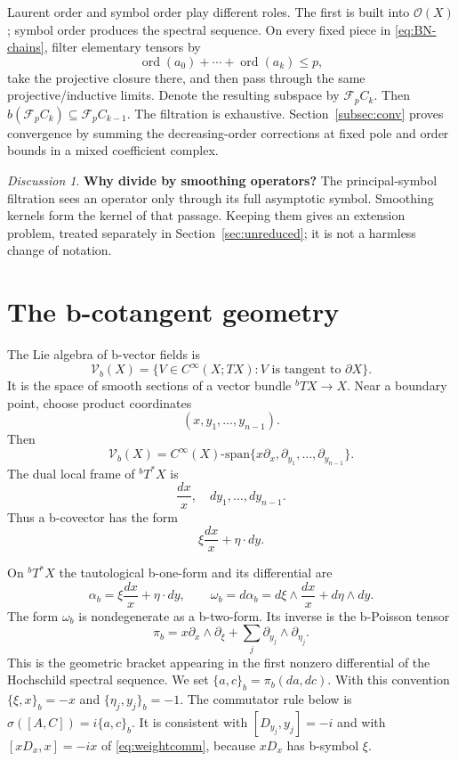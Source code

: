 \documentclass[11pt,oneside,reqno]{article}
\newcommand{\cO}{\mathcal O}
\newcommand{\Tbstar}{{}^{b}T^*X}
\theoremstyle{plain}
\theoremstyle{definition}
\theoremstyle{remark}
\newtheorem*{discussion}{Discussion}
\begin{document}
Laurent order and symbol order play different roles. The first is built
into \(\cO(X)\); symbol order produces the spectral sequence.  On every
fixed piece in \eqref{eq:BN-chains}, filter elementary tensors by
\[
 \operatorname{ord}(a_0)+\cdots+\operatorname{ord}(a_k)\leq p,
\]
take the projective closure there, and then pass through the same
projective/inductive limits.  Denote the resulting subspace by
\(\mathcal F_pC_k\).
Then \(b(\mathcal F_pC_k)\subseteq\mathcal F_pC_{k-1}\). The
filtration is exhaustive. Section~\ref{subsec:conv} proves convergence
by summing the decreasing-order corrections at fixed pole and order
bounds in a mixed coefficient complex.

\begin{discussion}
\textbf{Why divide by smoothing operators?}
The principal-symbol filtration sees an operator only through its full
asymptotic symbol. Smoothing kernels form the kernel of that passage. Keeping
them gives an extension problem, treated separately in
Section~\ref{sec:unreduced}; it is not a harmless change of notation.
\end{discussion}

\section{The b-cotangent geometry}

The Lie algebra of b-vector fields is
\[
 \mathcal V_b(X)
 =\{V\in C^\infty(X;TX):V\text{ is tangent to }\partial X\}.
\]
It is the space of smooth sections of a vector bundle \({}^bTX\to X\).
Near a boundary point, choose product coordinates
\[
 (x,y_1,\ldots,y_{n-1}).
\]
Then
\[
 \mathcal V_b(X)
 =C^\infty(X)\text{-span}
 \{x\partial_x,\partial_{y_1},\ldots,\partial_{y_{n-1}}\}.
\]
The dual local frame of \(\Tbstar\) is
\[
 \frac{dx}{x},\quad dy_1,\ldots,dy_{n-1}.
\]
Thus a b-covector has the form
\[
 \xi\frac{dx}{x}+\eta\cdot dy.
\]

On \(\Tbstar\) the tautological b-one-form and its differential are
\[
 \alpha_b=\xi\frac{dx}{x}+\eta\cdot dy,
 \qquad
 \omega_b=d\alpha_b
 =d\xi\wedge\frac{dx}{x}+d\eta\wedge dy.
\]
The form \(\omega_b\) is nondegenerate as a b-two-form. Its inverse is the
b-Poisson tensor
\[
 \pi_b=x\partial_x\wedge\partial_\xi
       +\sum_j\partial_{y_j}\wedge\partial_{\eta_j}.
\]
This is the geometric bracket appearing in the first nonzero differential of
the Hochschild spectral sequence. We set \(\{a,c\}_b=\pi_b(da,dc)\). With
this convention \(\{\xi,x\}_b=-x\) and \(\{\eta_j,y_j\}_b=-1\). The
commutator rule below is \(\sigma([A,C])=i\{a,c\}_b\). It is consistent with
\([D_{y_j},y_j]=-i\) and with \([xD_x,x]=-ix\) of \eqref{eq:weightcomm},
because \(xD_x\) has b-symbol \(\xi\).
\end{document}
